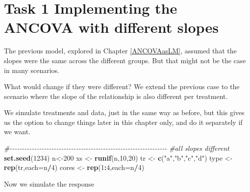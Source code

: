 \documentclass[
]{book}
\newenvironment{Shaded}{\begin{snugshade}}{\end{snugshade}}
\newcommand{\AttributeTok}[1]{\textcolor[rgb]{0.13,0.29,0.53}{#1}}
\newcommand{\CommentTok}[1]{\textcolor[rgb]{0.56,0.35,0.01}{\textit{#1}}}
\newcommand{\DecValTok}[1]{\textcolor[rgb]{0.00,0.00,0.81}{#1}}
\newcommand{\FunctionTok}[1]{\textcolor[rgb]{0.13,0.29,0.53}{\textbf{#1}}}
\newcommand{\NormalTok}[1]{#1}
\newcommand{\OtherTok}[1]{\textcolor[rgb]{0.56,0.35,0.01}{#1}}
\newcommand{\SpecialCharTok}[1]{\textcolor[rgb]{0.81,0.36,0.00}{\textbf{#1}}}
\newcommand{\StringTok}[1]{\textcolor[rgb]{0.31,0.60,0.02}{#1}}
\begin{document}
\hypertarget{task-1-implementing-the-ancova-with-different-slopes}{%
\section{Task 1 Implementing the ANCOVA with different slopes}\label{task-1-implementing-the-ancova-with-different-slopes}}

The previous model, explored in Chapter \ref{ANCOVAasLM}, assumed that the slopes were the same across the different groups. But that might not be the case in many scenarios.

What would change if they were different? We extend the previous case to the scenario where the slope of the relationship is also different per treatment.

We simulate treatments and data, just in the same way as before, but this gives us the option to change things later in this chapter only, and do it separately if we want.

\begin{Shaded}
\begin{Highlighting}[]
\CommentTok{\#{-}{-}{-}{-}{-}{-}{-}{-}{-}{-}{-}{-}{-}{-}{-}{-}{-}{-}{-}{-}{-}{-}{-}{-}{-}{-}{-}{-}{-}{-}{-}{-}{-}{-}{-}{-}{-}{-}{-}{-}{-}{-}{-}{-}{-}{-}{-}{-}{-}{-}{-}{-}{-}{-}{-}{-}{-}{-}{-}{-}{-}{-}{-}{-}}
\CommentTok{\#all slopes different}
\FunctionTok{set.seed}\NormalTok{(}\DecValTok{1234}\NormalTok{)}
\NormalTok{n}\OtherTok{\textless{}{-}}\DecValTok{200}
\NormalTok{xs }\OtherTok{\textless{}{-}} \FunctionTok{runif}\NormalTok{(n,}\DecValTok{10}\NormalTok{,}\DecValTok{20}\NormalTok{)}
\NormalTok{tr }\OtherTok{\textless{}{-}} \FunctionTok{c}\NormalTok{(}\StringTok{"a"}\NormalTok{,}\StringTok{"b"}\NormalTok{,}\StringTok{"c"}\NormalTok{,}\StringTok{"d"}\NormalTok{)}
\NormalTok{type }\OtherTok{\textless{}{-}} \FunctionTok{rep}\NormalTok{(tr,}\AttributeTok{each=}\NormalTok{n}\SpecialCharTok{/}\DecValTok{4}\NormalTok{)}
\NormalTok{cores }\OtherTok{\textless{}{-}} \FunctionTok{rep}\NormalTok{(}\DecValTok{1}\SpecialCharTok{:}\DecValTok{4}\NormalTok{,}\AttributeTok{each=}\NormalTok{n}\SpecialCharTok{/}\DecValTok{4}\NormalTok{)}
\end{Highlighting}
\end{Shaded}

Now we simulate the response
\end{document}
